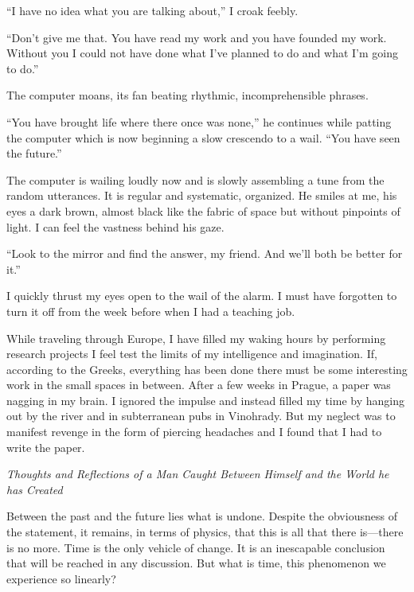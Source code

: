 ``I have no idea what you are talking about,'' I croak feebly.

``Don't give me that. You have read my work and you have founded my
work. Without you I could not have done what I've planned to do and what
I'm going to do.''

The computer moans, its fan beating rhythmic, incomprehensible phrases.

``You have brought life where there once was none,'' he continues while
patting the computer which is now beginning a slow crescendo to a wail.
``You have seen the future.''

The computer is wailing loudly now and is slowly assembling a tune from
the random utterances. It is regular and systematic, organized. He
smiles at me, his eyes a dark brown, almost black like the fabric of
space but without pinpoints of light. I can feel the vastness behind his
gaze.

``Look to the mirror and find the answer, my friend. And we'll both be
better for it.''

I quickly thrust my eyes open to the wail of the alarm. I must have
forgotten to turn it off from the week before when I had a teaching job.

While traveling through Europe, I have filled my waking hours by
performing research projects I feel test the limits of my intelligence
and imagination. If, according to the Greeks, everything has been done
there must be some interesting work in the small spaces in between.
After a few weeks in Prague, a paper was nagging in my brain. I ignored
the impulse and instead filled my time by hanging out by the river and
in subterranean pubs in Vinohrady. But my neglect was to manifest
revenge in the form of piercing headaches and I found that I had to
write the paper.

\emph{Thoughts and Reflections of a Man Caught Between Himself and the
World he has Created}

Between the past and the future lies what is undone. Despite the
obviousness of the statement, it remains, in terms of physics, that this
is all that there is---there is no more. Time is the only vehicle of
change. It is an inescapable conclusion that will be reached in any
discussion. But what is time, this phenomenon we experience so linearly?

